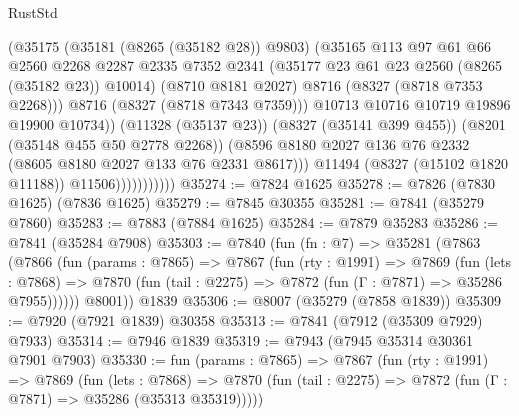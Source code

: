 \begin{lexlean}{RustStd}
\begin{coremodule}
                                (@35175
                                  (@35181 (@8265 (@35182 @28)) @9803)
                                  (@35165
                                    @113
                                    @97
                                    @61
                                    @66
                                    @2560
                                    @2268
                                    @2287
                                    @2335
                                    @7352
                                    @2341
                                    (@35177 @23 @61 @23 @2560 (@8265 (@35182 @23)) @10014)
                                    (@8710 @8181 @2027)
                                    @8716
                                    (@8327 (@8718 @7353 @2268)))
                                  @8716
                                  (@8327 (@8718 @7343 @7359)))
                                @10713
                                @10716
                                @10719
                                @19896
                                @19900
                                @10734))
                            (@11328 (@35137 @23))
                            (@8327 (@35141 @399 @455))
                            (@8201 (@35148 @455 @50 @2778 @2268))
                            (@8596
                              @8180
                              @2027
                              @136
                              @76
                              @2332
                              (@8605 @8180 @2027 @133 @76 @2331 @8617)))
                          @11494
                          (@8327 (@15102 @1820 @11188))
                          @11506)))))))))))
@35274 := @7824 @1625
@35278 := @7826 (@7830 @1625) (@7836 @1625)
@35279 := @7845 @30355
@35281 := @7841 (@35279 @7860)
@35283 := @7883 (@7884 @1625)
@35284 := @7879 @35283
@35286 := @7841 (@35284 @7908)
@35303 := @7840
    (fun (fn : @7) =>
    @35281
      (@7863
        (@7866
          (fun (params : @7865) =>
          @7867
            (fun (rty : @1991) =>
            @7869
              (fun (lets : @7868) =>
              @7870 (fun (tail : @2275) => @7872 (fun (Γ : @7871) => @35286 @7955))))))
        @8001))
    @1839
@35306 := @8007 (@35279 (@7858 @1839))
@35309 := @7920 (@7921 @1839) @30358
@35313 := @7841 (@7912 (@35309 @7929) @7933)
@35314 := @7946 @1839
@35319 := @7943 (@7945 @35314 @30361 @7901 @7903)
@35330 := fun (params : @7865) =>
  @7867
    (fun (rty : @1991) =>
    @7869
      (fun (lets : @7868) =>
      @7870 (fun (tail : @2275) => @7872 (fun (Γ : @7871) => @35286 (@35313 @35319)))))

\end{coremodule}
\end{lexlean}
